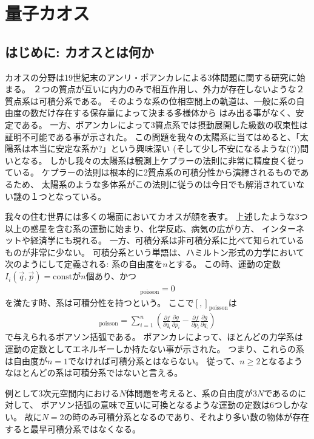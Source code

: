 \section{量子カオス \label{app:quantum_chaos}}

\subsection{はじめに: カオスとは何か}
カオスの分野は19世紀末のアンリ・ポアンカレによる3体問題に関する研究に始まる\cite{masoliver}。
２つの質点が互いに内力のみで相互作用し、外力が存在しないような２質点系は可積分系である。
そのような系の位相空間上の軌道は、一般に系の自由度の数だけ存在する保存量によって決まる多様体から
はみ出る事がなく、安定である。
一方、ポアンカレによって3質点系では摂動展開した級数の収束性は証明不可能である事が示された。
この問題を我々の太陽系に当てはめると、「太陽系は本当に安定な系か?」という興味深い
(そして少し不安になるような(?))問いとなる。
しかし我々の太陽系は観測上ケプラーの法則に非常に精度良く従っている。
ケプラーの法則は根本的に2質点系の可積分性から演繹されるものであるため、
太陽系のような多体系がこの法則に従うのは今日でも解消されていない謎の１つとなっている。

我々の住む世界には多くの場面においてカオスが顔を表す。
上述したような3つ以上の惑星を含む系の運動に始まり、化学反応、病気の広がり方、
インターネットや経済学にも現れる\cite{masoliver}。
一方、可積分系は非可積分系に比べて知られているものが非常に少ない。
可積分系という単語は、ハミルトン形式の力学において次のようにして定義される:
系の自由度を$n$とする。
この時、運動の定数$I_i(\vec{q}, \vec{p}) = \mathrm{const}$が$n$個あり、かつ
\begin{align}
	[I_i, I_j]_{\mathrm{poisson}} = 0
\end{align}
を満たす時、系は可積分性を持つという。
ここで$[,]_{\mathrm{poisson}}$は
\begin{align}
	[f,g]_{\mathrm{poisson}} = \sum_{i = 1}^{n}\left(
		\frac{\partial f}{\partial q_i}\frac{\partial g}{\partial p_i}
		- \frac{\partial f}{\partial p_i}\frac{\partial g}{\partial q_i}
	\right)
\end{align}
で与えられるポアソン括弧である。
ポアンカレによって、ほとんどの力学系は運動の定数としてエネルギーしか持たない事が示された\cite{masoliver}。
つまり、これらの系は自由度が$n=1$でなければ可積分系とはならない。
従って、$n \geq 2$となるようなほとんどの系は可積分系ではないと言える。

例として3次元空間内における$N$体問題を考えると、系の自由度が$3N$であるのに対して、
ポアソン括弧の意味で互いに可換となるような運動の定数は6つしかない。
故に$N=2$の時のみ可積分系となるのであり、それより多い数の物体が存在すると最早可積分系ではなくなる。

